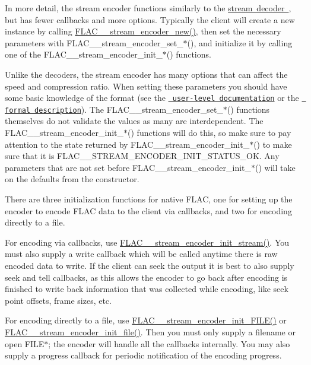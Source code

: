 In more detail, the stream encoder functions similarly to the \mbox{\hyperlink{group__flac__stream__decoder}{stream decoder }}, but has fewer callbacks and more options. Typically the client will create a new instance by calling \mbox{\hyperlink{group__flac__stream__encoder_ga35f3d94452bcf0a90a31c7d770b200bc}{F\+L\+A\+C\+\_\+\+\_\+stream\+\_\+encoder\+\_\+new()}}, then set the necessary parameters with F\+L\+A\+C\+\_\+\+\_\+stream\+\_\+encoder\+\_\+set\+\_\+$\ast$(), and initialize it by calling one of the F\+L\+A\+C\+\_\+\+\_\+stream\+\_\+encoder\+\_\+init\+\_\+$\ast$() functions.

Unlike the decoders, the stream encoder has many options that can affect the speed and compression ratio. When setting these parameters you should have some basic knowledge of the format (see the \href{../documentation_format_overview.html}{\texttt{ user-\/level documentation}} or the \href{../format.html}{\texttt{ formal description}}). The F\+L\+A\+C\+\_\+\+\_\+stream\+\_\+encoder\+\_\+set\+\_\+$\ast$() functions themselves do not validate the values as many are interdependent. The F\+L\+A\+C\+\_\+\+\_\+stream\+\_\+encoder\+\_\+init\+\_\+$\ast$() functions will do this, so make sure to pay attention to the state returned by F\+L\+A\+C\+\_\+\+\_\+stream\+\_\+encoder\+\_\+init\+\_\+$\ast$() to make sure that it is F\+L\+A\+C\+\_\+\+\_\+\+S\+T\+R\+E\+A\+M\+\_\+\+E\+N\+C\+O\+D\+E\+R\+\_\+\+I\+N\+I\+T\+\_\+\+S\+T\+A\+T\+U\+S\+\_\+\+OK. Any parameters that are not set before F\+L\+A\+C\+\_\+\+\_\+stream\+\_\+encoder\+\_\+init\+\_\+$\ast$() will take on the defaults from the constructor.

There are three initialization functions for native F\+L\+AC, one for setting up the encoder to encode F\+L\+AC data to the client via callbacks, and two for encoding directly to a file.

For encoding via callbacks, use \mbox{\hyperlink{group__flac__stream__encoder_ga85221c4ceb9f22dfd4983d8f07a9a35b}{F\+L\+A\+C\+\_\+\+\_\+stream\+\_\+encoder\+\_\+init\+\_\+stream()}}. You must also supply a write callback which will be called anytime there is raw encoded data to write. If the client can seek the output it is best to also supply seek and tell callbacks, as this allows the encoder to go back after encoding is finished to write back information that was collected while encoding, like seek point offsets, frame sizes, etc.

For encoding directly to a file, use \mbox{\hyperlink{group__flac__stream__encoder_ga78653fea5d9bc490fff34e3ef86de944}{F\+L\+A\+C\+\_\+\+\_\+stream\+\_\+encoder\+\_\+init\+\_\+\+F\+I\+L\+E()}} or \mbox{\hyperlink{group__flac__stream__encoder_ga693bb5ed30d912822e0e6c7c0404428c}{F\+L\+A\+C\+\_\+\+\_\+stream\+\_\+encoder\+\_\+init\+\_\+file()}}. Then you must only supply a filename or open {\ttfamily F\+I\+L\+E$\ast$}; the encoder will handle all the callbacks internally. You may also supply a progress callback for periodic notification of the encoding progress.

